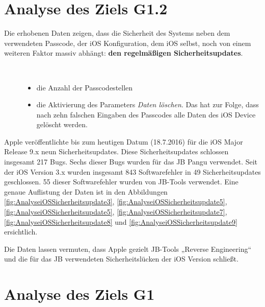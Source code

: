  
\section{Analyse des Ziels G1.2}
\label{sec:AnalyseG12}


Die erhobenen Daten zeigen, dass die Sicherheit des Systems neben dem verwendeten Passcode, der iOS Konfiguration, dem iOS selbst, noch von einem weiteren Faktor massiv abhängt: \textbf{den regelmäßigen Sicherheitsupdates}.  
\begin{description}
    \item[\parbox{\textwidth} {Bei der Konfiguration sind folgende Konfigurationsparameter anzuführen}]~\par
    \begin{itemize}
       \item die Anzahl der Passcodestellen
       \item die Aktivierung des Parameters \textit{\glqq Daten löschen\grqq{}}. Das hat zur Folge, dass nach zehn falschen Eingaben des Passcodes alle Daten des iOS Device gelöscht werden.
    \end{itemize}
\end{description} 

Apple veröffentlichte bis zum heutigen Datum (18.7.2016) für die iOS Major Release 9.x neun Sicherheitsupdates. Diese Sicherheitsupdates schlossen insgesamt 217 Bugs. Sechs dieser Bugs wurden für das JB Pangu verwendet.  Seit der iOS Version 3.x wurden insgesamt 843 Softwarefehler in 49 Sicherheitsupdates geschlossen. 55 dieser Softwarefehler wurden von JB-Tools verwendet. Eine genaue Auflistung der Daten ist in den Abbildungen \ref{fig:AnalyseiOSSicherheitsupdate3}, \ref{fig:AnalyseiOSSicherheitsupdate5}, \ref{fig:AnalyseiOSSicherheitsupdate5}, \ref{fig:AnalyseiOSSicherheitsupdate7}, \ref{fig:AnalyseiOSSicherheitsupdate8} und \ref{fig:AnalyseiOSSicherheitsupdate9} ersichtlich.

Die Daten lassen vermuten, dass Apple gezielt JB-Tools „Reverse Engineering“ und die für das JB verwendeten Sicherheitslücken der iOS Version schließt.
\section{Analyse des Ziels G1}
\label{sec:AnalyseG1}

